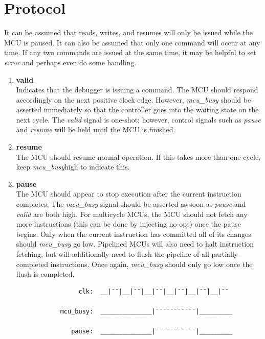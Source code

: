 \documentclass[10pt,a4paper]{article}
\begin{document}
\newpage
\section{Protocol}

It can be assumed that reads, writes, and resumes will only be issued while the MCU is paused. It
can also be assumed that only one command will occur at any time. If any two commands are issued at the
same time, it may be helpful to set \emph{error} and perhaps even do some handling.

\begin{enumerate}

    \item\textbf{valid}\\
    Indicates that the debugger is issuing a command. The MCU should respond accordingly on the next
    positive clock edge. However, \emph{mcu\_busy} should be asserted immediately so that the
    controller goes into the waiting state on the next cycle. The \emph{valid} signal is one-shot;
    however, control signals such as \emph{pause} and \emph{resume} will be held until the MCU is
    finished.

    \item\textbf{resume}\\
    The MCU should resume normal operation. If this takes more than one cycle,
    keep \emph{mcu\_busy}high to indicate this.

    \item\textbf{pause}\\
    The MCU should appear to stop execution after the current instruction completes. The
    \emph{mcu\_busy} signal should be asserted as soon as \emph{pause} and \emph{valid} are both
    high. For multicycle MCUs, the MCU should not fetch any more instructions (this can be done by
    injecting no-ops) once the pause begins. Only when the current instruction has committed
    all of its changes should \emph{mcu\_busy} go low. Pipelined MCUs will also need to halt 
    instruction fetching, but will additionally need to flush the pipeline of all partially completed
    instructions. Once again, \emph{mcu\_busy} should only go low once the flush is completed.

        \begin{verbatim}
                 clk:  __|¯¯|__|¯¯|__|¯¯|__|¯¯|__|¯¯|__|¯¯

            mcu_busy:  ______________|¯¯¯¯¯¯¯¯¯¯¯|_________

               pause:  ______________|¯¯¯¯¯¯¯¯¯¯¯|_________


\end{verbatim}
\end{enumerate}
\end{document}

